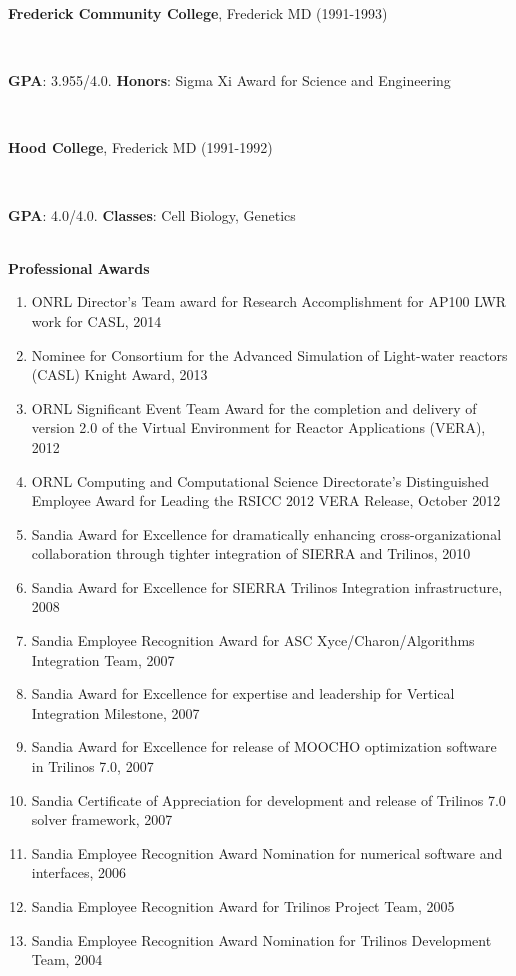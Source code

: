 \documentclass{report}
\newcommand{\secendvs}{1.5ex}
\newcommand{\indentone}{0.5in}
\newcommand{\widthone}{6.4in}
\newcommand{\pboxone}{\hspace*{\indentone}\parbox[t]{\widthone}}
\newcommand{\indenttwo}{0.75in}
\newcommand{\widthtwo}{6.15in}
\newcommand{\pboxtwo}{\hspace*{\indenttwo}\parbox[t]{\widthtwo}}
\begin{document}
{}\pboxone{\textbf{Frederick Community College}, Frederick MD
(1991-1993)}\\
%
{}\pboxtwo{\textbf{GPA}: 3.955/4.0.  {}\textbf{Honors}: Sigma Xi Award for Science and Engineering} \\[\secendvs]
%
{}\pboxone{\textbf{Hood College}, Frederick MD (1991-1992)} \\
%
{}\pboxtwo{\textbf{GPA}: 4.0/4.0. {}\textbf{Classes}: Cell Biology, Genetics} \\[\secendvs]
%
%
{}\textbf{\Large Professional Awards}
%
\begin{enumerate}
%
{}\item ONRL Director's Team award for Research Accomplishment for AP100 LWR work for CASL, 2014
%
{}\item Nominee for Consortium for the Advanced Simulation of Light-water reactors (CASL) Knight Award, 2013
%
{}\item ORNL Significant Event Team Award for the completion and delivery of version 2.0 of the Virtual Environment for Reactor Applications (VERA), 2012
%
{}\item ORNL Computing and Computational Science Directorate's Distinguished Employee Award for Leading the RSICC 2012 VERA Release, October 2012
%
{}\item Sandia Award for Excellence for dramatically enhancing cross-organizational collaboration through tighter integration of SIERRA and Trilinos, 2010
%
{}\item Sandia Award for Excellence for SIERRA Trilinos Integration infrastructure, 2008
%
{}\item Sandia Employee Recognition Award for ASC Xyce/Charon/Algorithms Integration Team, 2007
%
{}\item Sandia Award for Excellence for expertise and leadership for Vertical Integration Milestone, 2007
%
{}\item Sandia Award for Excellence for release of MOOCHO optimization software in Trilinos 7.0, 2007
%
{}\item Sandia Certificate of Appreciation for development and release of Trilinos 7.0 solver framework, 2007 
%
{}\item Sandia Employee Recognition Award Nomination for numerical software and interfaces, 2006 
%
{}\item Sandia Employee Recognition Award for Trilinos Project Team, 2005 
%
{}\item Sandia Employee Recognition Award Nomination for Trilinos Development Team, 2004 

\end{enumerate}
\end{document}

